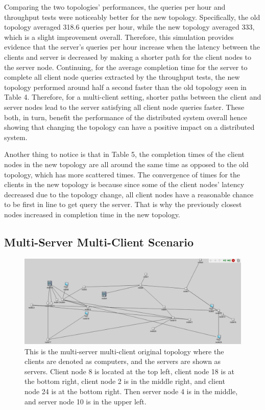 	Comparing the two topologies' performances, the queries per hour and throughput tests were noticeably better for the new topology. Specifically, the old topology averaged 318.6 queries per hour, while the new topology averaged 333, which is a slight improvement overall. Therefore, this simulation provides evidence that the server's queries per hour increase when the latency between the clients and server is decreased by making a shorter path for the client nodes to the server node. Continuing, for the average completion time for the server to complete all client node queries extracted by the throughput tests, the new topology performed around half a second faster than the old topology seen in Table 4. Therefore, for a multi-client setting, shorter paths between the client and server nodes lead to the server satisfying all client node queries faster. These both, in turn, benefit the performance of the distributed system overall hence showing that changing the topology can have a positive impact on a distributed system.

Another thing to notice is that in Table 5, the completion times of the client nodes in the new topology are all around the same time as opposed to the old topology, which has more scattered times. The convergence of times for the clients in the new topology is because since some of the client nodes' latency decreased due to the topology change, all client nodes have a reasonable chance to be first in line to get query the server. That is why the previously closest nodes increased in completion time in the new topology.





\subsection{Multi-Server Multi-Client Scenario}

\begin{figure}[tp]
\centering
\includegraphics[width=0.5 \textwidth]{figures/MultServerOrig}
\caption{This is the multi-server multi-client original topology where the clients are denoted as computers, and the servers are shown as servers. Client node 8 is located at the top left, client node 18 is at the bottom right, client node 2 is in the middle right, and client node 24 is at the bottom right. Then server node 4 is in the middle, and server node 10 is in the upper left.
}
\end{figure}

